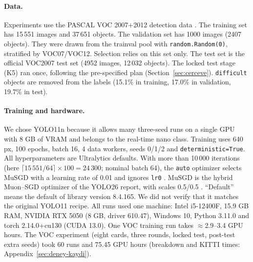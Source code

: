\documentclass[pdflatex,iicol,sn-mathphys-num]{sn-jnl}
\begin{document}
\paragraph{Data.}
Experiments use the PASCAL VOC 2007+2012 detection data \cite{everingham_2010_voc}. The training set has 15\,551 images and 37\,651 objects. The validation set has 1000 images (2407 objects). They were drawn from the trainval pool with \texttt{random.Random(0)}, stratified by VOC07/VOC12. Selection relies on this set only. The test set is the official VOC2007 test set (4952 images, 12\,032 objects). The locked test stage (K5) ran once, following the pre-specified plan (Section~\ref{sec:cerceve}). \texttt{difficult} objects are removed from the labels (15.1\% in training, 17.0\% in validation, 19.7\% in test).

\paragraph{Training and hardware.}
We chose YOLO11n because it allows many three-seed runs on a single GPU with 8 GB of VRAM and belongs to the real-time nano class. Training uses 640 px, 100 epochs, batch 16, 4 data workers, seeds 0/1/2 and \texttt{deterministic=True}. All hyperparameters are Ultralytics defaults. With more than 10\,000 iterations (here $\lceil 15\,551/64\rceil\times 100=24\,300$; nominal batch 64), the \texttt{auto} optimizer selects MuSGD with a learning rate of 0.01 and ignores \texttt{lr0} \cite{ultralytics_2026_v84165}. MuSGD is the hybrid Muon--SGD optimizer of the YOLO26 report, with scales 0.5/0.5 \cite{jocher_2026_yolo26}. ``Default'' means the default of library version 8.4.165. We did not verify that it matches the original YOLO11 recipe. All runs used one machine: Intel i5-12400F, 15.9 GB RAM, NVIDIA RTX 5050 (8 GB, driver 610.47), Windows 10, Python 3.11.0 and torch 2.14.0+cu130 (CUDA 13.0). One VOC training run takes $\approx$2.9--3.4 GPU hours. The VOC experiment (eight cards, three rounds, locked test, post-test extra seeds) took 60 runs and 75.45 GPU hours (breakdown and KITTI times: Appendix~\ref{sec:deney-kaydi}).
\end{document}
